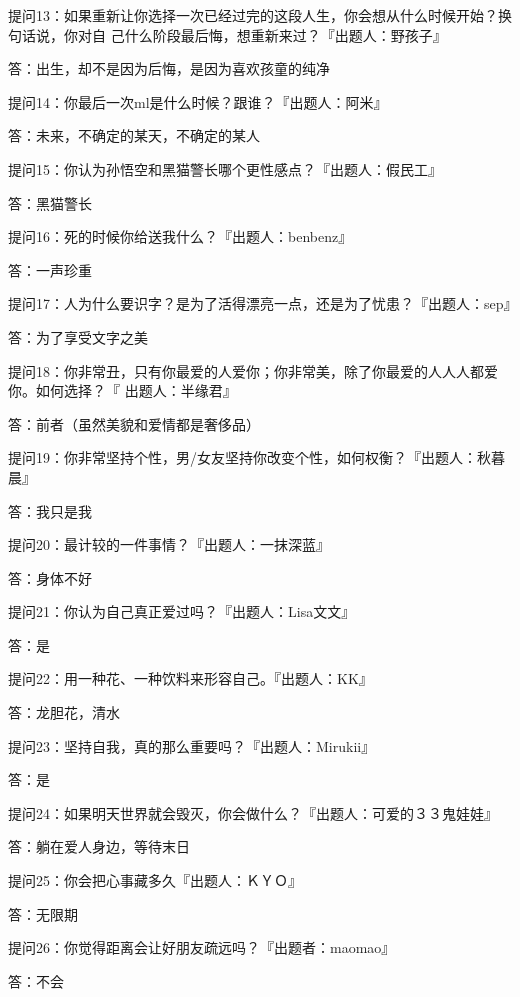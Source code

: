 \documentclass[12pt,a4paper]{article}
\def\blankrev{\vspace{1ex}}									%
\begin{document}
		\blankrev
		提问13：如果重新让你选择一次已经过完的这段人生，你会想从什么时候开始？换句话说，你对自
				己什么阶段最后悔，想重新来过？『出题人：野孩子』\par
		答：出生，却不是因为后悔，是因为喜欢孩童的纯净

		\blankrev
		提问14：你最后一次ml是什么时候？跟谁？『出题人：阿米』\par
		答：未来，不确定的某天，不确定的某人

		\blankrev
		提问15：你认为孙悟空和黑猫警长哪个更性感点？『出题人：假民工』\par
		答：黑猫警长

		\blankrev
		提问16：死的时候你给送我什么？『出题人：benbenz』\par
		答：一声珍重

		\blankrev
		提问17：人为什么要识字？是为了活得漂亮一点，还是为了忧患？『出题人：sep』\par
		答：为了享受文字之美

		\blankrev
		提问18：你非常丑，只有你最爱的人爱你；你非常美，除了你最爱的人人人都爱你。如何选择？『
				出题人：半缘君』\par
		答：前者（虽然美貌和爱情都是奢侈品）

		\blankrev
		提问19：你非常坚持个性，男/女友坚持你改变个性，如何权衡？『出题人：秋暮晨』\par
		答：我只是我

		\blankrev
		提问20：最计较的一件事情？『出题人：一抹深蓝』\par
		答：身体不好

		\blankrev
		提问21：你认为自己真正爱过吗？『出题人：Lisa文文』\par
		答：是

		\blankrev
		提问22：用一种花、一种饮料来形容自己。『出题人：KK』\par
		答：龙胆花，清水

		\blankrev
		提问23：坚持自我，真的那么重要吗？『出题人：Mirukii』\par
		答：是

		\blankrev
		提问24：如果明天世界就会毁灭，你会做什么？『出题人：可爱的３３鬼娃娃』\par
		答：躺在爱人身边，等待末日

		\blankrev
		提问25：你会把心事藏多久『出题人：ＫＹＯ』\par
		答：无限期

		\blankrev
		提问26：你觉得距离会让好朋友疏远吗？『出题者：maomao』\par
		答：不会
\end{document}
